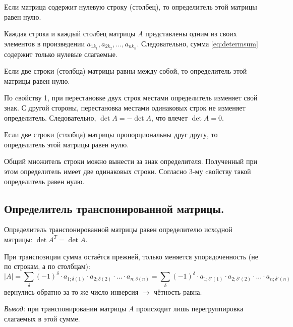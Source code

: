 \documentclass[a4paper,14pt]{article}
\begin{document}
\begin{property}
	Если матрица содержит нулевую строку (столбец), то определитель этой матрицы равен нулю.
	\begin{evidence}
		Каждая строка и каждый столбец матрицы $A$ представлены одним из своих элементов в произведении $a_{1k_1}, a_{2k_2}, ..., a_{nk_n}$. Следовательно, сумма \eqref{eq:determsum} содержит только нулевые слагаемые.
	\end{evidence}
\end{property}
\begin{property}
	Если две строки (столбца) матрицы равны между собой, то определитель этой матрицы равен нулю.
	\begin{evidence}
		По cвойству 1, при перестановке двух строк местами определитель изменяет свой знак. С другой стороны, перестановка местами одинаковых строк не изменяет определитель. Следовательно, $\det A = - \det A$, что влечет $\det A = 0$.
	\end{evidence}
\end{property}
\begin{property}
	Если две строки (столбца) матрицы пропорциональны друг другу, то определитель этой матрицы равен нулю.
	\begin{evidence}
		Общий множитель строки можно вынести за знак определителя. Полученный при этом определитель имеет две одинаковых строки. Согласно 3-му cвойству такой определитель равен нулю.
	\end{evidence}
\end{property}
\subsection{Определитель транспонированной матрицы.}
Определитель транспонированной матрицы равен определителю исходной матрицы: $\det A^T = \det A$.
\begin{evidence}
	При транспозиции сумма остаётся прежней, только меняется упорядоченность (не по строкам, а по столбцам):
	\[
	|A| = \sum_{\delta}(-1)^{\delta} \cdot a_{1;\delta(1)} \cdot a_{2;\delta(2)} \cdot ... \cdot a_{n;\delta(n)} = \sum_{\delta}(-1)^{\delta} \cdot a_{1;\delta'(1)} \cdot a_{2;\delta'(2)} \cdot ... \cdot a_{n;\delta'(n)}
	\]
	вернулись обратно за то же число инверсия $\rightarrow$ чётность равна. 
	
	\textit{Вывод:} при транспонировании матрицы $A$ происходит лишь перегруппировка слагаемых в этой сумме.
\end{evidence}
\end{document}
